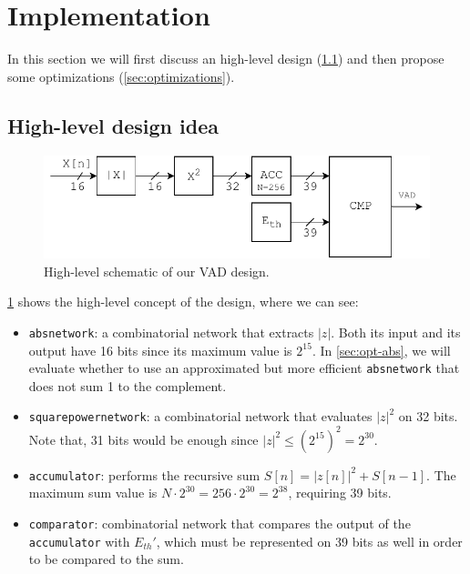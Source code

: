 \section{Implementation}
In this section we will first discuss an high-level design (\ref{sec:high-level})
and then propose some optimizations (\ref{sec:optimizations}).

\subsection{High-level design idea}
\label{sec:high-level}

\begin{figure}[h!]
  \centering
  \includegraphics{figs/vad_simple_schematic.pdf}
  \caption{High-level schematic of our VAD design.}
  \label{fig:simple_schematic}
\end{figure}

\cref{fig:simple_schematic} shows the high-level concept of the design, where we 
can see:
\begin{itemize}
  \item \texttt{absnetwork}: a combinatorial network that extracts $|z|$. Both 
    its input and its output have 16 bits since its maximum value is $2^{15}$. 
    In \cref{sec:opt-abs}, we will evaluate whether to use an approximated 
    but more efficient \texttt{absnetwork} that does not sum 1 to the complement.
  \item \texttt{squarepowernetwork}: a combinatorial network that evaluates
    $|z|^2$ on 32 bits. Note that, 31 bits would be enough since 
    $|z|^2 \le (2^{15})^2 = 2^{30}$.
  \item \texttt{accumulator}: performs the recursive sum $S[n] = |z[n]|^2 + S[n - 1]$.
    The maximum sum value is $N \cdot 2^{30} = 256 \cdot 2^{30} = 2^{38}$, 
    requiring 39 bits.
  \item \texttt{comparator}: combinatorial network that compares the output
    of the \texttt{accumulator} with $E_{th}'$, which must be represented on 39
    bits as well in order to be compared to the sum.
\end{itemize}


